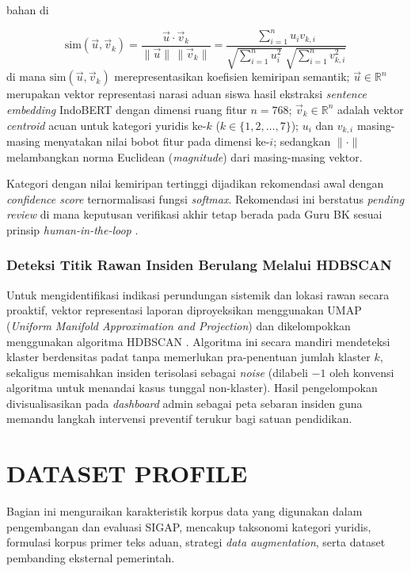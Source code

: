 bahan di\documentclass[conference]{IEEEtran}
\begin{document}
\begin{equation}
  \text{sim}(\vec{u}, \vec{v}_k) = \frac{\vec{u} \cdot \vec{v}_k}{\|\vec{u}\|\,\|\vec{v}_k\|} = \frac{\displaystyle\sum_{i=1}^{n} u_i v_{k,i}}{\sqrt{\displaystyle\sum_{i=1}^{n} u_i^2}\;\sqrt{\displaystyle\sum_{i=1}^{n} v_{k,i}^2} }
  \label{eq:cosine}
\end{equation}
di mana $\text{sim}(\vec{u}, \vec{v}_k)$ merepresentasikan koefisien kemiripan semantik; $\vec{u} \in \mathbb{R}^n$ merupakan vektor representasi narasi aduan siswa hasil ekstraksi \textit{sentence embedding} IndoBERT dengan dimensi ruang fitur $n = 768$; $\vec{v}_k \in \mathbb{R}^n$ adalah vektor \textit{centroid} acuan untuk kategori yuridis ke-$k$ ($k \in \{1, 2, \dots, 7\}$); $u_i$ dan $v_{k,i}$ masing-masing menyatakan nilai bobot fitur pada dimensi ke-$i$; sedangkan $\|\cdot\|$ melambangkan norma Euclidean (\textit{magnitude}) dari masing-masing vektor.

Kategori dengan nilai kemiripan tertinggi dijadikan rekomendasi awal dengan \textit{confidence score} ternormalisasi fungsi \textit{softmax}. Rekomendasi ini berstatus \textit{pending review} di mana keputusan verifikasi akhir tetap berada pada Guru BK sesuai prinsip \textit{human-in-the-loop} \cite{sele2024,nabiilah2024}.

\subsubsection{Deteksi Titik Rawan Insiden Berulang Melalui HDBSCAN}
Untuk mengidentifikasi indikasi perundungan sistemik dan lokasi rawan secara proaktif, vektor representasi laporan diproyeksikan menggunakan UMAP (\textit{Uniform Manifold Approximation and Projection}) \cite{grootendorst2022} dan dikelompokkan menggunakan algoritma HDBSCAN \cite{malzer2020,hanny2024}. Algoritma ini secara mandiri mendeteksi klaster berdensitas padat tanpa memerlukan pra-penentuan jumlah klaster $k$, sekaligus memisahkan insiden terisolasi sebagai \textit{noise} (dilabeli $-1$ oleh konvensi algoritma untuk menandai kasus tunggal non-klaster). Hasil pengelompokan divisualisasikan pada \textit{dashboard} admin sebagai peta sebaran insiden guna memandu langkah intervensi preventif terukur bagi satuan pendidikan.

\section{DATASET PROFILE}

Bagian ini menguraikan karakteristik korpus data yang digunakan dalam pengembangan dan evaluasi SIGAP, mencakup taksonomi kategori yuridis, formulasi korpus primer teks aduan, strategi \textit{data augmentation}, serta dataset pembanding eksternal pemerintah.
\end{document}
